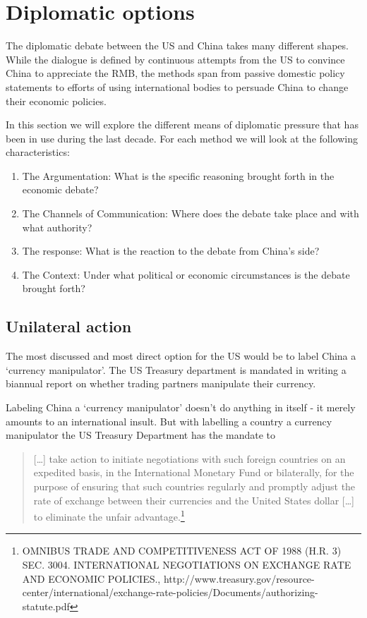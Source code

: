 \section{Diplomatic options}


The diplomatic debate between the US and China takes many different 
shapes. While the dialogue is defined by continuous attempts from the US 
to convince China to appreciate the RMB, the methods span from passive 
domestic policy statements to efforts of using international bodies to 
persuade China to change their economic policies.

In this section we will explore the different means of diplomatic 
pressure that has been in use during the last decade. For each method we 
will look at the following characteristics:

\begin{enumerate}
	\item{The Argumentation: What is the specific reasoning brought 
		forth in the economic debate?}
	\item{The Channels of Communication: Where does the debate take 
		place and with what authority?}
	\item{The response: What is the reaction to the debate from China's 
		side?}
	\item{The Context: Under what political or economic circumstances is 
		the debate brought forth?}
\end{enumerate}



\subsection{Unilateral action}

The most discussed and most direct option for the US would be to label China a `currency manipulator'. The US Treasury department is mandated in writing a biannual report on whether trading partners manipulate their currency.  

Labeling China a `currency manipulator' doesn't do anything in itself - it merely amounts to an international insult. But with labelling a country a currency manipulator the US Treasury Department has the mandate to
\begin{quote}
[\dots] take action to initiate negotiations with such foreign countries on an expedited basis, in the International Monetary Fund or bilaterally, for the purpose of ensuring that such countries regularly and promptly adjust the rate of exchange between their currencies and the United States dollar [\dots] to eliminate the unfair advantage.\footnote{OMNIBUS TRADE AND COMPETITIVENESS ACT OF 1988 (H.R. 3)
SEC. 3004. INTERNATIONAL NEGOTIATIONS ON EXCHANGE RATE AND ECONOMIC POLICIES., http://www.treasury.gov/resource-center/international/exchange-rate-policies/Documents/authorizing-statute.pdf}
\end{quote}

